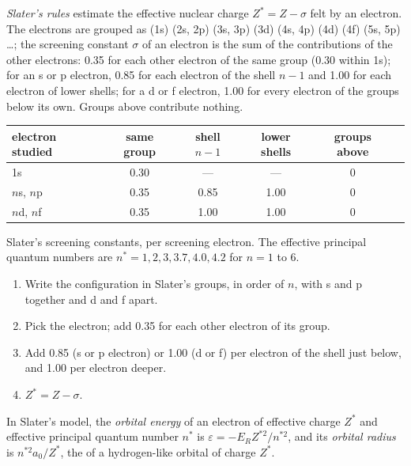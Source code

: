 \begin{definition}\label{def:b2:atomic-orbitals:slater}
\emph{Slater's rules} estimate the effective nuclear charge
$Z^* = Z - \sigma$ felt by an electron. The electrons are grouped as
(1s) (2s, 2p) (3s, 3p) (3d) (4s, 4p) (4d) (4f) (5s, 5p) \dots; the screening
constant $\sigma$ of an electron is the sum of the contributions of the other
electrons: 0.35 for each other electron of the same group (0.30 within 1s);
for an s or p electron, 0.85 for each electron of the shell $n - 1$ and 1.00 for
each electron of lower shells; for a d or f electron, 1.00 for every electron
of the groups below its own. Groups above contribute nothing.
\end{definition}

\begin{omfigure}
\small
\renewcommand{\arraystretch}{1.2}
\begin{tabular}{l|ccccc}
electron studied & same group & shell $n - 1$ & lower shells & groups above \\ \hline
1s & 0.30 & --- & --- & 0 \\
$n$s, $n$p & 0.35 & 0.85 & 1.00 & 0 \\
$n$d, $n$f & 0.35 & 1.00 & 1.00 & 0 \\
\end{tabular}

\smallskip
{\small Slater's screening constants, per screening electron. The effective
principal quantum numbers are $n^* = 1, 2, 3, 3.7, 4.0, 4.2$ for $n = 1$ to 6.}
\end{omfigure}

\begin{method}\label{met:b2:atomic-orbitals:slater}
\begin{enumerate}
  \item Write the configuration in Slater's groups, in order of $n$, with s and p
        together and d and f apart.
  \item Pick the electron; add 0.35 for each other electron of its group.
  \item Add 0.85 (s or p electron) or 1.00 (d or f) per electron of the shell just
        below, and 1.00 per electron deeper.
  \item $Z^* = Z - \sigma$.
\end{enumerate}
\end{method}

\begin{definition}\label{def:b2:atomic-orbitals:orbital-energy}
In Slater's model, the \emph{orbital energy} of an electron
of effective charge $Z^*$ and effective principal quantum number $n^*$ is
$\varepsilon = -E_RZ^{*2}/n^{*2}$, and its \emph{orbital radius}
is $n^{*2}a_0/Z^*$, the  of a hydrogen-like orbital of charge
$Z^*$.
\end{definition}

